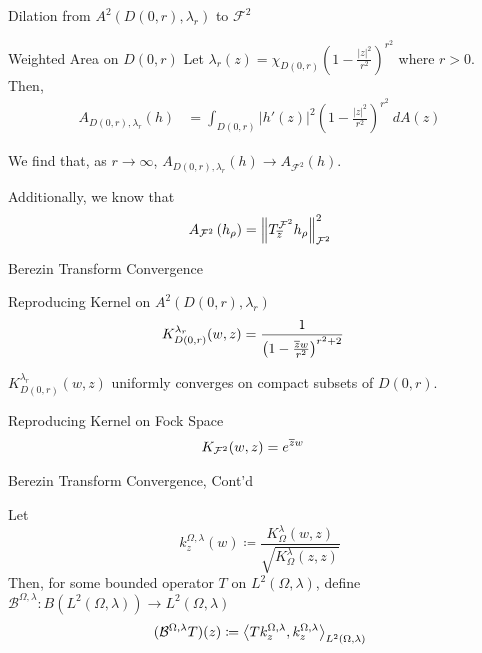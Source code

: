 \documentclass{reu_beamer}
\begin{document}
\begin{frame}{Dilation from $A^2\left(D(0,r), \lambda_r\right)$ to $\mathcal{F}^2$}
    \begin{block}{Weighted Area on $D(0,r)$}
        Let $\lambda_r(z) = \chi_{D(0, r)}\left(1 - \frac{|z|^2}{r^2}\right)^{r^2}$ where \(r > 0\). Then,
        \begin{align*}
            A_{D(0, r),\lambda_r}(h) &= \int_{D(0,r)}\left\vert h'(z)\right\vert^2\left(1 - \frac{|z|^2}{r^2}\right)^{r^2}\: d A(z)
        \end{align*}
    \end{block}
    We find that, as $r\rightarrow\infty$, $A_{D(0, r),\lambda_r}(h) \rightarrow A_{\mathcal{F}^2}(h)$.\newline %
    
    Additionally, we know that
   \begin{align*}
      A_{\mathcal{F}^2}\left(h_{\rho}\right)&=\left\Vert T^{\mathcal{F}^2}_{\overline{z}}h_{\rho} \right\Vert^2_{\mathcal{F}^2}\\
   \end{align*}
\end{frame}
\begin{frame}{Berezin Transform Convergence}
    \begin{block}{Reproducing Kernel on $A^{2}\left(D(0,r),\lambda_r\right)$}
        \begin{align*}
            K_{D(0,r)}^{\lambda_r}(w, z) &= \frac{1}{\left(1 - \frac{\overline{z}w}{r^2}\right)^{r^2 + 2}}
        \end{align*}
    \end{block}
    $K_{D(0,r)}^{\lambda_r}(w, z)$ uniformly converges on compact subsets of $D(0,r)$.
    \begin{block}{Reproducing Kernel on Fock Space}
        \begin{align*}
            K_{\mathcal{F}^2}(w,z) &= e^{\overline{z}w}
        \end{align*}
    \end{block}
\end{frame}
\begin{frame}{Berezin Transform Convergence, Cont'd}
    \begin{definition}
        Let
        \[k^{\Omega, \lambda}_z(w) \coloneq \frac{K_\Omega^ \lambda(w, z)}{\sqrt{K_\Omega^ \lambda(z, z)}}\]
        Then, for some bounded operator $T$ on \(L^2(\Omega, \lambda)\), define \(\mathcal{B}^{\Omega, \lambda} : B(L^2(\Omega, \lambda)) \to L^2(\Omega, \lambda)\)
        \[(\mathcal{B}^{\Omega, \lambda}T)(z) \coloneq \left\langle T k^{\Omega, \lambda}_z, k^{\Omega, \lambda}_z\right\rangle_{L^2(\Omega, \lambda)}\]
    \end{definition}
\end{frame}
\end{document}
